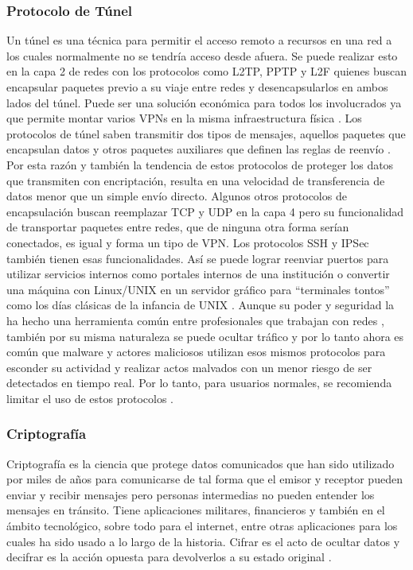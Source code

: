 \subsubsection{Protocolo de Túnel}
Un túnel es una técnica para permitir el acceso remoto a recursos en una red a los cuales normalmente no se tendría acceso desde afuera. Se puede realizar esto en la capa 2 de redes con los protocolos como L2TP, PPTP y L2F quienes buscan encapsular paquetes previo a su viaje entre redes y desencapsularlos en ambos lados del túnel. Puede ser una solución económica para todos los involucrados ya que permite montar varios VPNs en la misma infraestructura física \citep{Cisco-Tunneling}. Los protocolos de túnel saben transmitir dos tipos de mensajes, aquellos paquetes que encapsulan datos y otros paquetes auxiliares que definen las reglas de reenvío \citep{Kaspersky-Tunneling}. Por esta razón y también la tendencia de estos protocolos de proteger los datos que transmiten con encriptación, resulta en una velocidad de transferencia de datos menor que un simple envío directo. Algunos otros protocolos de encapsulación buscan reemplazar TCP y UDP en la capa 4 pero su funcionalidad de transportar paquetes entre redes, que de ninguna otra forma serían conectados, es igual y forma un tipo de VPN. Los protocolos SSH y IPSec también tienen esas funcionalidades. Así se puede lograr reenviar puertos para utilizar servicios internos como portales internos de una institución o convertir una máquina con Linux/UNIX en un servidor gráfico para “terminales tontos” \citep{ENP-Tunneling} como los días clásicas de la infancia de UNIX \citep{GeerlingJeff-History-Remote-Access}. Aunque su poder y seguridad la ha hecho una herramienta común entre profesionales que trabajan con redes \citep{ENP-Tunneling}, también por su misma naturaleza se puede ocultar tráfico y por lo tanto ahora es común que malware y actores maliciosos utilizan esos mismos protocolos para esconder su actividad y realizar actos malvados con un menor riesgo de ser detectados en tiempo real. Por lo tanto, para usuarios normales, se recomienda limitar el uso de estos protocolos \citep{Kaspersky-Tunneling}.

\subsubsection{Criptografía}
Criptografía es la ciencia que protege datos comunicados que han sido utilizado por miles de años para comunicarse de tal forma que el emisor y receptor pueden enviar y recibir mensajes pero personas intermedias no pueden entender los mensajes en tránsito. Tiene aplicaciones militares, financieros y también en el ámbito tecnológico, sobre todo para el internet, entre otras aplicaciones para los cuales ha sido usado a lo largo de la historia. Cifrar es el acto de ocultar datos y decifrar es la acción opuesta para devolverlos a su estado original \citep{Khanacademy-What-is-Cryptography}.

